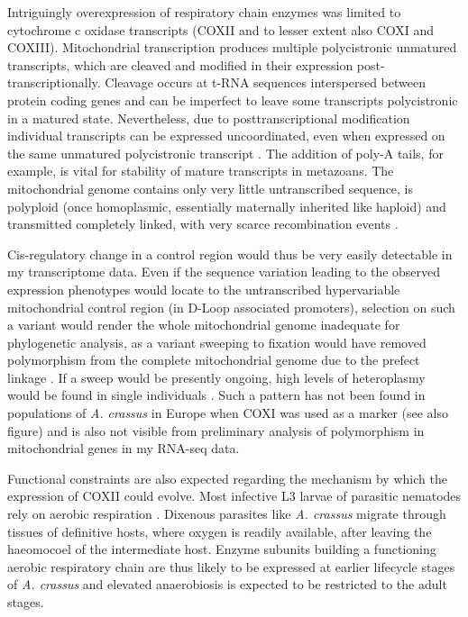 \documentclass[10pt]{article}
\begin{document}
Intriguingly overexpression of respiratory chain enzymes was limited
to cytochrome c oxidase transcripts (COXII and to lesser extent also
COXI and COXIII). Mitochondrial transcription produces multiple
polycistronic unmatured transcripts, which are cleaved and modified in
their expression post-transcriptionally. Cleavage occurs at t-RNA
sequences interspersed between protein coding genes and can be
imperfect to leave some transcripts polycistronic in a matured
state. Nevertheless, due to posttranscriptional modification
individual transcripts can be expressed uncoordinated, even when
expressed on the same unmatured polycistronic transcript
\cite{pmid19843606}. The addition of poly-A tails, for example, is
vital for stability of mature transcripts in metazoans. The
mitochondrial genome contains only very little untranscribed sequence,
is polyploid (once homoplasmic, essentially maternally inherited like
haploid) and transmitted completely linked, with very scarce
recombination events \cite{pmid18023115}.

Cis-regulatory change in a control region would thus be very easily
detectable in my transcriptome data. Even if the sequence variation
leading to the observed expression phenotypes would locate to the
untranscribed hypervariable mitochondrial control region (in D-Loop
associated promoters), selection on such a variant would render the
whole mitochondrial genome inadequate for phylogenetic analysis, as a
variant sweeping to fixation would have removed polymorphism from the
complete mitochondrial genome due to the prefect linkage
\cite{pmid19821901}. If a sweep would be presently ongoing, high
levels of heteroplasmy would be found in single individuals
\cite{pmid21226948}. Such a pattern has not been found in populations
of \textit{A. crassus} in Europe when COXI was used as a marker
\cite{wielgoss_population_2008, dl_py} (see also figure) and is also
not visible from preliminary analysis of polymorphism in mitochondrial
genes in my RNA-seq data.

Functional constraints are also expected regarding the mechanism by
which the expression of COXII could evolve. Most infective L3 larvae
of parasitic nematodes rely on aerobic respiration
\cite{kennedy2001parasitic}. Dixenous parasites like
\textit{A. crassus} migrate through tissues of definitive hosts, where
oxygen is readily available, after leaving the haeomocoel of the
intermediate host. Enzyme subunits building a functioning aerobic
respiratory chain are thus likely to be expressed at earlier lifecycle
stages of \textit{A. crassus} and elevated anaerobiosis is expected to
be restricted to the adult stages.
\end{document}
